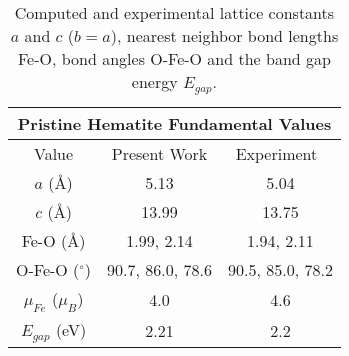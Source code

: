 \begin{table}[H]
    \footnotesize
    \centering
    \begin{tabular}{c c c}
         \hline
         \multicolumn{3}{c}{ Pristine Hematite Fundamental Values \vspace{0.5mm}} \\
         \hline
         Value & Present Work & Experiment~\cite{finger1980crystal} \\
         \hline
         $a$ ({\AA}) & 5.13  & 5.04 \\
         $c$ ({\AA}) & 13.99  & 13.75 \\
         Fe-O ({\AA}) & 1.99, 2.14  & 1.94, 2.11 \\
         O-Fe-O ($^{\circ}$) &  90.7, 86.0, 78.6 & 90.5, 85.0, 78.2 \\
         $\mu_{Fe}$ ($\mu_B$) & 4.0 & 4.6 \cite{coey1971study} \\
         $E_{gap}$ (eV) &  2.21  & 2.2  \cite{gilbert2009band}\\
         \hline
    \end{tabular}
    \caption{Computed and experimental lattice constants $a$ and $c$ ($b=a$), nearest neighbor bond lengths Fe-O, bond angles O-Fe-O and the band gap energy $E_{gap}$.}
    \label{fe2o3:table:pristine}
\end{table}


